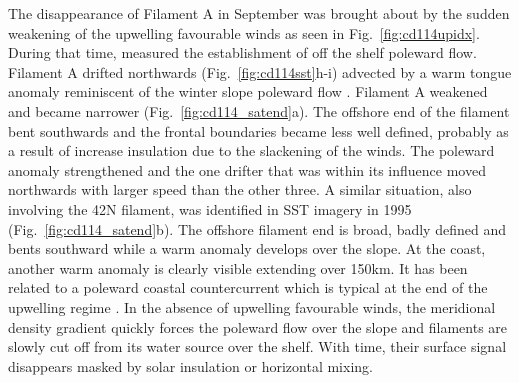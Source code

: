 The disappearance of Filament A in September was brought about by
the sudden weakening of the upwelling favourable winds as seen in
Fig.~\ref{fig:cd114upidx}. During that time, \citet{Peliz02}
measured the establishment of off the shelf poleward flow.
Filament A drifted northwards (Fig.~\ref{fig:cd114sst}h-i)
advected by a warm tongue anomaly reminiscent of the winter slope
poleward flow \citep[e.g.][]{Haynes90}. Filament A weakened and
became narrower (Fig.~\ref{fig:cd114_satend}a). The offshore end
of the filament bent southwards and the frontal boundaries became
less well defined, probably as a result of increase insulation due
to the slackening of the winds. The poleward anomaly strengthened
and the one drifter that was within its influence moved northwards
with larger speed than the other three. A similar situation, also
involving the 42\deg N filament, was identified in SST imagery in
1995 (Fig.~\ref{fig:cd114_satend}b). The offshore filament end is
broad, badly defined and bents southward while a warm anomaly
develops over the slope. At the coast, another warm anomaly is
clearly visible extending over 150km. It has been related to a
poleward coastal countercurrent which is typical at the end of the
upwelling regime \citep{Sordo01}. In the absence of upwelling
favourable winds, the meridional density gradient quickly forces
the poleward flow over the slope and filaments are slowly cut off
from its water source over the shelf. With time, their surface
signal disappears masked by solar insulation or horizontal mixing.

